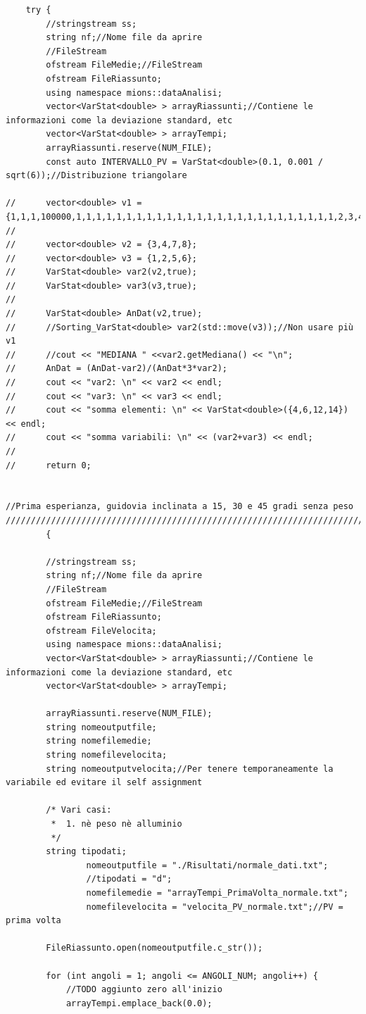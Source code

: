 \documentclass[12pt]{article} %
\begin{document}
\begin{verbatim}
	try {
		//stringstream ss;
		string nf;//Nome file da aprire
		//FileStream
		ofstream FileMedie;//FileStream
		ofstream FileRiassunto;
		using namespace mions::dataAnalisi;
		vector<VarStat<double> > arrayRiassunti;//Contiene le informazioni come la deviazione standard, etc
		vector<VarStat<double> > arrayTempi;
		arrayRiassunti.reserve(NUM_FILE);
		const auto INTERVALLO_PV = VarStat<double>(0.1, 0.001 / sqrt(6));//Distribuzione triangolare

//		vector<double> v1 = {1,1,1,100000,1,1,1,1,1,1,1,1,1,1,1,1,1,1,1,1,1,1,1,1,1,1,1,1,1,1,2,3,4,2,1,3,2};
//
//		vector<double> v2 = {3,4,7,8};
//		vector<double> v3 = {1,2,5,6};
//		VarStat<double> var2(v2,true);
//		VarStat<double> var3(v3,true);
//
//		VarStat<double> AnDat(v2,true);
//		//Sorting_VarStat<double> var2(std::move(v3));//Non usare più v1
//		//cout << "MEDIANA " <<var2.getMediana() << "\n";
//		AnDat = (AnDat-var2)/(AnDat*3*var2);
//		cout << "var2: \n" << var2 << endl;
//		cout << "var3: \n" << var3 << endl;
//		cout << "somma elementi: \n" << VarStat<double>({4,6,12,14}) << endl;
//		cout << "somma variabili: \n" << (var2+var3) << endl;
//
//		return 0;


//Prima esperianza, guidovia inclinata a 15, 30 e 45 gradi senza peso
///////////////////////////////////////////////////////////////////////////////////////////////////
		{

		//stringstream ss;
		string nf;//Nome file da aprire
		//FileStream
		ofstream FileMedie;//FileStream
		ofstream FileRiassunto;
		ofstream FileVelocita;
		using namespace mions::dataAnalisi;
		vector<VarStat<double> > arrayRiassunti;//Contiene le informazioni come la deviazione standard, etc
		vector<VarStat<double> > arrayTempi;

		arrayRiassunti.reserve(NUM_FILE);
		string nomeoutputfile;
		string nomefilemedie;
		string nomefilevelocita;
		string nomeoutputvelocita;//Per tenere temporaneamente la variabile ed evitare il self assignment

		/* Vari casi:
		 * 	1. nè peso nè alluminio
		 */
		string tipodati;
				nomeoutputfile = "./Risultati/normale_dati.txt";
				//tipodati = "d";
				nomefilemedie = "arrayTempi_PrimaVolta_normale.txt";
				nomefilevelocita = "velocita_PV_normale.txt";//PV = prima volta

		FileRiassunto.open(nomeoutputfile.c_str());

		for (int angoli = 1; angoli <= ANGOLI_NUM; angoli++) {
			//TODO aggiunto zero all'inizio
			arrayTempi.emplace_back(0.0);


\end{verbatim}
\end{document}
